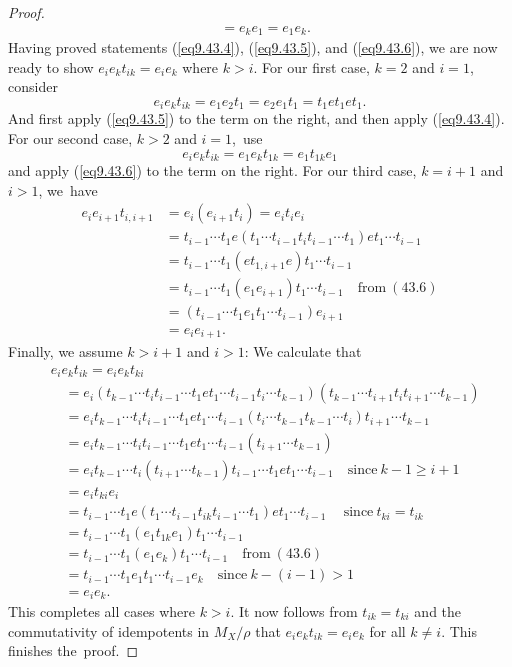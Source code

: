\documentclass{surv-l}
\numberwithin{equation}{section}
\numberwithin{table}{section}
\numberwithin{figure}{section}
\theoremstyle{plain}
\theoremstyle{definition}
\begin{document}
\begin{proof}
\begin{align*}
&=e_{k}e_{1}=e_{1}e_{k}.
\end{align*}
Having proved statements (\ref{eq9.43.4}), (\ref{eq9.43.5}), and
(\ref{eq9.43.6}), we are now ready to show
$e_{i}e_{k}t_{ik}=e_{i}e_{k}$ where $k>i$. For our first case,
$k=2$ and $i=1$, consider
\[
e_{i}e_{k}t_{ik}=e_{1}e_{2}t_{1}=e_{2}e_{1}t_{1}=t_{1}et_{1}et_{1}.
\]
And first apply (\ref{eq9.43.5}) to the term on the right, and
then apply (\ref{eq9.43.4}). For our second case, $k>2$ and
$i=1$,~use
\[
e_{i}e_{k}t_{ik}=e_{1}e_{k}t_{1k}=e_{1}t_{1k}e_{1}
\]
and apply (\ref{eq9.43.6}) to the term on the right. For our third
case, $k=i+1$ and $i>1$, we~have
\begin{align*}
e_{i}e_{i+1}t_{i,i+1}&=e_{i}(e_{i+1}t_{i})=e_{i}t_{i}e_{i} \\
&=t_{i-1}\cdots t_{1}e(t_{1}\cdots t_{i-1}t_{i}t_{i-1}\cdots t_{1})et_{1}\cdots t_{i-1} \\
&=t_{i-1}\cdots t_{1}(et_{1,i+1}e)t_{1}\cdots t_{i-1} \\
&=t_{i-1}\cdots t_{1}(e_{1}e_{i+1})t_{1}\cdots t_{i-1}\quad \mathrm{from}\ (43.6) \\
&=(t_{i-1}\cdots t_{1}e_{1}t_{1}\cdots t_{i-1})e_{i+1} \\
&=e_{i}e_{i+1}.
\end{align*}
Finally, we assume $k>i+1$ and $i>1$: We calculate that
\begin{align*}
&e_{i}e_{k}t_{ik}=e_{i}e_{k}t_{ki} \\
&\quad=e_{i}(t_{k-1}\cdots t_{i}t_{i-1}\cdots t_{1}et_{1}\cdots
t_{i-1}t_{i}\cdots t_{k-1}) (t_{k-1}\cdots t_{i+1}t_{i}t_{i+1}\cdots t_{k-1})\\
&\quad=e_{i}t_{k-1}\cdots t_{i}t_{i-1}\cdots t_{1}et_{1}\cdots t_{i-1}(t_{i}\cdots
t_{k-1}t_{k-1}\cdots t_{i})t_{i+1}\cdots t_{k-1} \\
&\quad=e_{i}t_{k-1}\cdots t_{i}t_{i-1}\cdots t_{1}et_{1}\cdots
t_{i-1}(t_{i+1}\cdots t_{k-1}) \\
&\quad=e_{i}t_{k-1}\cdots t_{i}(t_{i+1}\cdots t_{k-1})t_{i-1}\cdots
t_{1}et_{1}\cdots t_{i-1}\quad \mathrm{since}\ k-1\geq i+1\\
&\quad=e_{i}t_{ki}e_{i} \\
&\quad=t_{i-1}\cdots t_{1}e(t_{1}\cdots t_{i-1}t_{ik}t_{i-1}\cdots
t_{1})et_{1}\cdots t_{i-1}\quad\ \mathrm{since}\ t_{ki}=t_{ik} \\
&\quad=t_{i-1}\cdots t_{1}(e_{1}t_{1k}e_{1})t_{1}\cdots t_{i-1} \\
&\quad=t_{i-1}\cdots t_{1}(e_{1}e_{k})t_{1}\cdots t_{i-1}\quad \mathrm{from}\ (43.6)\\
&\quad=t_{i-1}\cdots t_{1}e_{1}t_{1}\cdots t_{i-1}e_{k}\quad \mathrm{since}\ k-(i-1)>1 \\
&\quad=e_{i}e_{k}.
\end{align*}
This completes all cases where $k>i$. It now follows from
$t_{ik}=t_{ki}$ and the commutativity of idempotents in
$M_{X}/\rho$ that $e_{i}e_{k}t_{ik}=e_{i}e_{k}$ for all $k\neq i$.
This finishes the~proof.
\end{proof}
\end{document}

